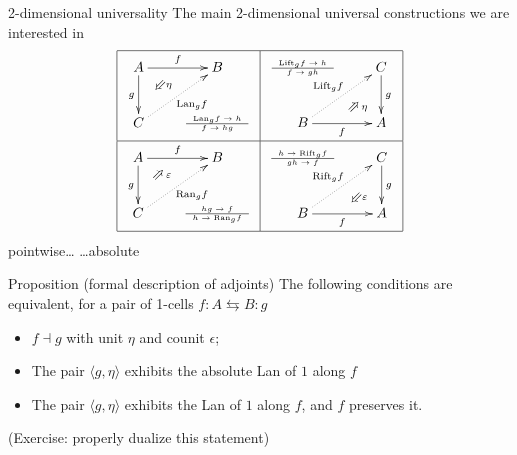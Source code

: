 \documentclass{beamer}
\begin{document}
\begin{frame}{2-dimensional universality}
	The main 2-dimensional universal constructions we are interested in%
	\[
		\begin{array}{|c|c|}\hline
			\xymatrix{
			A \ar@{}[dr]|(.3){\Swarrow\eta}\ar[d]_g \ar[r]^f        & B                                      \\
			C \ar@{.>}[ur]_{\Lan_gf}                                & {\tiny \deduction{\Lan_gf}{h}{f}{hg}}
			}
			                                                        &
			\xymatrix{
			{\tiny \deduction{\Lift_gf}{h}{f}{gh}}                  & C\ar[d]^g                              \\
			B\ar[r]_f \ar@{.>}[ur]^{\Lift_gf}                       & \ar@{}[ul]|(.3){\Nearrow\eta} A
			}                                                                                                \\ \hline
			\xymatrix{
			A \ar@{}[dr]|(.3){\Nearrow\varepsilon}\ar[d]_g \ar[r]^f & B                                      \\ C
			\ar@{.>}[ur]_{\Ran_gf}                                  & {\tiny \deduction{hg}{f}{h}{\Ran_gf}}
			}
			                                                        &
			\xymatrix{
			{\tiny \deduction{h}{\Rift_gf}{gh}{f}}                  & C\ar[d]^g                              \\ B\ar[r]_f
			\ar@{.>}[ur]^{\Rift_gf}                                 & \ar@{}[ul]|(.3){\Swarrow\varepsilon} A
			}                                                                                                \\ \hline
		\end{array}
	\]
	{\onslide<2->\alert{pointwise}\dots} \hspace{\fill} {\onslide<3->\dots\alert{absolute}}
\end{frame}
\begin{frame}
	\begin{block}{Proposition (formal description of adjoints)}
		The following conditions are equivalent, for a pair of 1-cells \(f : A \leftrightarrows B : g\)
		\begin{itemize}
			\item<+->  $f \dashv g$ with unit $\eta$ and counit $\epsilon$;
			\item<+->  The pair $\langle g,\eta\rangle$ exhibits the absolute Lan of $1$ along $f$
			\item<+->  The pair $\langle g,\eta\rangle$ exhibits the Lan of $1$ along $f$, and $f$ preserves it.
		\end{itemize}
	\end{block}
	\onslide<+->	(Exercise: properly dualize this statement)
\end{frame}
\end{document}
